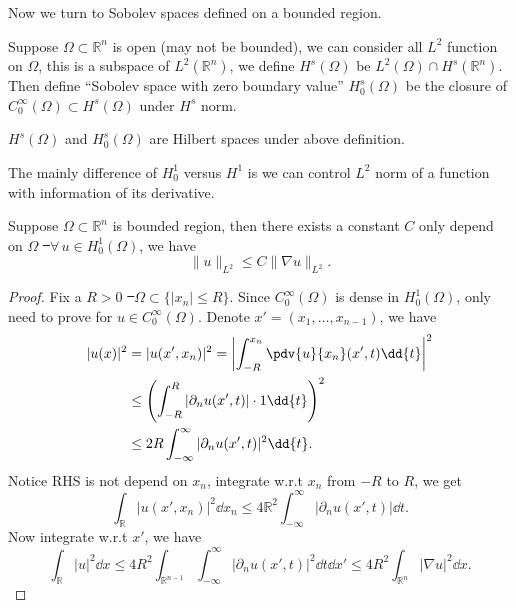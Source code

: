 \documentclass[UTF8,12pt]{article}
\numberwithin{theorem}{section}
\numberwithin{equation}{section}
\newcommand{\gap}{\hspace{0pt}}
\begin{document}
\hfill

Now we turn to Sobolev spaces defined on a bounded region.
\begin{definition}\hfill\par
    Suppose \(\Omega\subset \mathbb{R}^n\) is open (may not be bounded),
    we can consider all \(L^2\) function on \(\Omega\), this is a subspace of
    \(L^2(\mathbb{R}^n)\), we define \(H^s(\Omega)\) be \(L^2(\Omega)\cap 
    H^s(\mathbb{R}^n)\). Then define ``Sobolev space with zero boundary value''
    \(H_0^s(\Omega)\) be the closure of \(C_0^\infty(\Omega)\subset H^s(\Omega)\)
    under \(H^s\) norm.
\end{definition}
\begin{theorem}
    \(H^s(\Omega)\) and \(H_0^s(\Omega)\) are Hilbert spaces under above definition.
\end{theorem}

The mainly difference of \(H_0^1\) versus \(H^1\) is we can control \(L^2\) norm
of a function with information of its derivative.
\begin{theorem}\label{thm:poincare} \hfill\par
    Suppose \(\Omega\subset \mathbb{R}^n\) is bounded region, then there exists a
    constant \(C\) only depend on \(\Omega\) \st\ \(\forall\,u\in H_0^1(\Omega)\),
    we have \[
        \|u\|_{L^2}\le C\|\nabla u\|_{L^2}
    .\] 
\end{theorem}
\begin{proof}
    Fix a \(R>0\) \st\ \(\Omega\subset\{|x_n|\le R\}\). Since \(C_0^\infty(\Omega)\)
    is dense in \(H_0^1(\Omega)\), only need to prove for \(u\in C_0^\infty(\Omega)
    \). Denote \(x'=(x_1,\ldots,x_{n-1})\), we have
    \begin{align*}
        |u(x)|^2
        &=|u(x',x_n)|^2=\left|\int_{-R}^{x_n}\pdv{u}{x_n}\gap(x',t)
        \dd{t}\right|^2 \\
        &\le \left(\int_{-R}^{R}|\partial_n u(x',t)|\cdot 1\dd{t}\right)^2 \\
        &\le 2R\int_{-\infty}^{\infty}|\partial_n u(x',t)|^2\dd{t}
    .\end{align*}
    Notice RHS is not depend on \(x_n\), integrate w.r.t \(x_n\) from \(-R\) to
    \(R\), we get \[
        \int_{\mathbb{R}}|u(x',x_n)|^2\dd{x_n}\le 
        4\mathbb{R}^2 \int_{-\infty}^{\infty}|\partial_n u(x',t)|\dd{t}
    .\] Now integrate w.r.t \(x'\), we have \[
        \int_{\mathbb{R}}|u|^2\dd{x}\le 4R^2\int_{\mathbb{R}^{n-1}}
        \int_{-\infty}^{\infty}|\partial_n u(x',t)|^2\dd{t}\dd{x'}
        \le 4R^2 \int_{\mathbb{R}^n}|\nabla u|^2\dd{x}
    .\] 
\end{proof}
\end{document}
